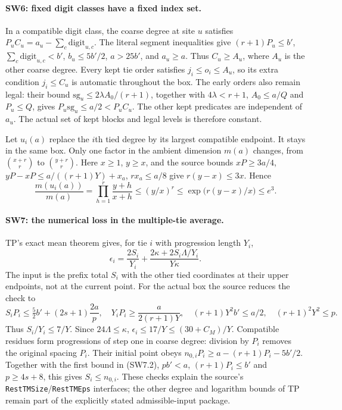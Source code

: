\documentclass[11pt,a4paper]{article}
\numberwithin{equation}{section}
\theoremstyle{remark}\newtheorem{remark}[theorem]{Remark}
\begin{document}
\paragraph{SW6: fixed digit classes have a fixed index set.}
In a compatible digit class, the coarse degree at site $u$ satisfies
$P_u C_u=a_u-\sum_c\mathrm{digit}_{u,c}$.
The literal segment inequalities give
$(r+1)P_u\le b'$, $\sum_c\mathrm{digit}_{u,c}<b'$,
$b_u\le5b'/2$, $a>25b'$, and $a_u\ge a$.
Thus $C_u\ge A_u$, where $A_u$ is the other coarse degree.
Every kept tie order satisfies $j_i\le o_i\le A_u$,
so its extra condition $j_i\le C_u$ is automatic throughout the box.
The early orders also remain legal: their bound
$\mathrm{sg}_u\le2\lambda A_0/(r+1)$, together with
$4\lambda<r+1$, $A_0\le a/Q$ and $P_u\le Q$,
gives $P_u\mathrm{sg}_u\le a/2<P_uC_u$.
The other kept predicates are independent of $a_u$.
The actual set of kept blocks and legal levels is therefore constant.

Let $u_i(a)$ replace the $i$th tied degree by its largest compatible
endpoint. It stays in the same box. Only one factor in the ambient
dimension $m(a)$ changes, from $\binom{x+r}r$ to $\binom{y+r}r$.
Here $x\ge1$, $y\ge x$, and the source bounds
$xP\ge3a/4$, $yP-xP\le a/((r+1)Y)+x_a$,
$rx_a\le a/8$ give $r(y-x)\le3x$. Hence
\[
 \frac{m(u_i(a))}{m(a)}
 =\prod_{h=1}^r\frac{y+h}{x+h}
 \le(y/x)^r\le\exp\!\big(r(y-x)/x\big)\le e^3.
 \tag{SW6.1}
\]

\paragraph{SW7: the numerical loss in the multiple-tie average.}
TP's exact mean theorem gives, for tie $i$ with progression length $Y_i$,
\[
 \epsilon_i=\frac{2S_i}{Y_i}
       +\frac{2\kappa+2S_i\Lambda/Y_i}{Y\kappa}.
 \tag{SW7.1}
\]
The input is the prefix total $S_i$ with the other tied coordinates at
their upper endpoints, not at the current point.
For the actual box the source reduces the check to
\[
 S_iP_i\le\tfrac52b'+(2s+1)\frac{2a}{p},\quad
 Y_iP_i\ge\frac{a}{2(r+1)Y},\quad
 (r+1)Y^2b'\le a/2,\quad (r+1)^2Y^2\le p.
 \tag{SW7.2}
\]
Thus $S_i/Y_i\le7/Y$. Since $24\Lambda\le\kappa$,
$\epsilon_i\le17/Y\le(30+C_M)/Y$.
Compatible residues form progressions of step one in coarse degree:
division by $P_i$ removes the original spacing $P_i$.
Their initial point obeys
$n_{0,i}P_i\ge a-(r+1)P_i-5b'/2$.
Together with the first bound in (SW7.2), $pb'<a$,
$(r+1)P_i\le b'$ and $p\ge4s+8$, this gives $S_i\le n_{0,i}$.
These checks explain the source's \texttt{RestTMSize}/\texttt{RestTMEps}
interfaces; the other degree and logarithm bounds of TP remain part of
the explicitly stated admissible-input package.
\end{document}

